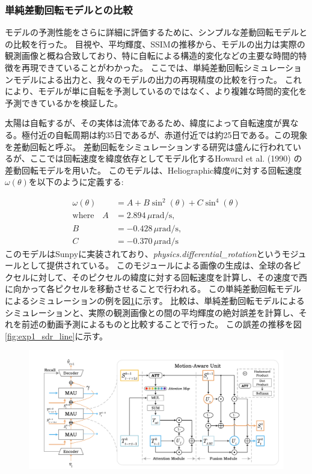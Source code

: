       \subsubsection{単純差動回転モデルとの比較}
        モデルの予測性能をさらに詳細に評価するために、シンプルな差動回転モデルとの比較を行った。
        目視や、平均輝度、SSIMの推移から、モデルの出力は実際の観測画像と概ね合致しており、特に自転による構造的変化などの主要な時間的特徴を再現できていることがわかった。
        ここでは、単純差動回転シミュレーションモデルによる出力と、我々のモデルの出力の再現精度の比較を行った。
        これにより、モデルが単に自転を予測しているのではなく、より複雑な時間的変化を予測できているかを検証した。

        太陽は自転するが、その実体は流体であるため、緯度によって自転速度が異なる。極付近の自転周期は約35日であるが、赤道付近では約25日である。この現象を差動回転と呼ぶ。
        差動回転をシミュレーションする研究は盛んに行われているが、ここでは回転速度を緯度依存としてモデル化するHoward et al. (1990) \cite{howard1990solar}の差動回転モデルを用いた。
        このモデルは、Heliographic緯度\(\theta\)に対する回転速度\(\omega(\theta)\)を以下のように定義する:
        
        \begin{align}
          \omega(\theta) &= A + B \sin^{2}(\theta) + C \sin^{4}(\theta) \\
          \text{where} \quad A &= 2.894 \, \mu\text{rad/s}, \\
          B &= -0.428 \, \mu\text{rad/s}, \\
          C &= -0.370 \, \mu\text{rad/s}
        \end{align}
        このモデルはSunpyに実装されており、\textit{physics.differential\_rotation}というモジュールとして提供されている。
        このモジュールによる画像の生成は、全球の各ピクセルに対して、そのピクセルの緯度に対する回転速度を計算し、その速度で西に向かって各ピクセルを移動させることで行われる。
        この単純差動回転モデルによるシミュレーションの例を図\ref{fig:exp1_sdr_example}に示す。
        比較は、単純差動回転モデルによるシミュレーションと、実際の観測画像との間の平均輝度の絶対誤差を計算し、それを前述の動画予測によるものと比較することで行った。
        この誤差の推移を図\ref{fig:exp1_sdr_line}に示す。
        \begin{figure}[htpb]
          \centering
          \includegraphics[width=\textwidth]{figures/mau.png}
          \caption{}
          \label{fig:exp1_sdr_example}
        \end{figure}

